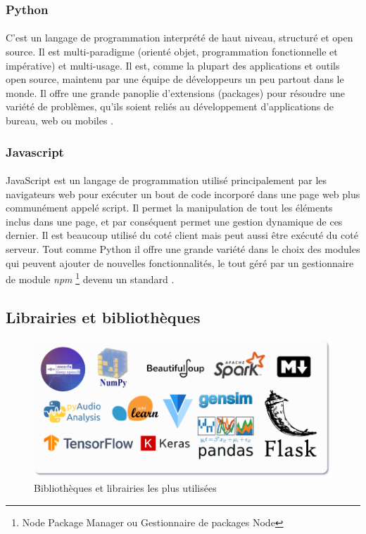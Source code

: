		\subsubsection*{Python}
		\label{python}
		\paragraph{}
		 C'est un langage de programmation interprété de haut niveau, structuré et open source. Il est multi-paradigme (orienté objet, programmation fonctionnelle et impérative) et multi-usage. Il est, comme la plupart des applications et outils open source, maintenu par une équipe de développeurs un peu partout dans le monde. Il offre une grande panoplie d'extensions (packages) pour résoudre une variété de problèmes, qu'ils soient reliés au développement d'applications de bureau, web ou mobiles \cite{python}.
		
		\subsubsection*{Javascript} 
		\paragraph{}
		JavaScript est un langage de programmation utilisé principalement par les navigateurs web pour exécuter un bout de code incorporé dans une page web plus communément appelé script. Il permet la manipulation de tout les éléments inclus dans une page, et par conséquent permet une gestion dynamique de ces dernier. Il est beaucoup utilisé du coté client mais peut aussi être exécuté du coté serveur. Tout comme Python il offre une grande variété dans le choix des modules qui peuvent ajouter de nouvelles fonctionnalités, le tout géré par un gestionnaire de module \textit{npm} \footnote{Node Package Manager ou Gestionnaire de packages Node} devenu un standard \cite{js}.
	
	\subsection{Librairies et bibliothèques}
	\begin{figure}[H] 
		\centering
		\includegraphics[width=0.9\linewidth]{images/implementation/libs_frams.png}
		\caption{Bibliothèques et librairies les plus utilisées}
		\label{fig:libs_frams}
	\end{figure}

